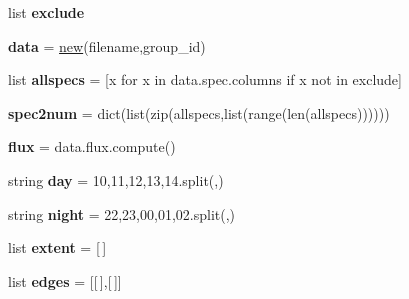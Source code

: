 \begin{DoxyCompactItemize}
\item 
list {\bfseries exclude}
\item 
\mbox{\label{namespacez__multilayer__infomap_a854ef70f57fed9974191d26a9f791af4}} 
{\bfseries data} = \mbox{\hyperlink{classzhdf_1_1new}{new}}(filename,group\+\_\+id)
\item 
\mbox{\label{namespacez__multilayer__infomap_a215e0369fdc8b0f8ca8080c40fe8a2c1}} 
list {\bfseries allspecs} = \mbox{[}x for x in data.\+spec.\+columns if x not in exclude\mbox{]}
\item 
\mbox{\label{namespacez__multilayer__infomap_a44a61e86e0415d87c5a739e50ccc5c9f}} 
{\bfseries spec2num} = dict(list(zip(allspecs,list(range(len(allspecs))))))
\item 
\mbox{\label{namespacez__multilayer__infomap_a6bd22719a7c02fd95aab5ec2ecc03496}} 
{\bfseries flux} = data.\+flux.\+compute()
\item 
\mbox{\label{namespacez__multilayer__infomap_ab64f17b32c3e9b3003413b0f2bbf1388}} 
string {\bfseries day} = \textquotesingle{}10,11,12,13,14\textquotesingle{}.split(\textquotesingle{},\textquotesingle{})
\item 
\mbox{\label{namespacez__multilayer__infomap_ad1c46cf12bd33975ca9f8a42677afeb0}} 
string {\bfseries night} = \textquotesingle{}22,23,00,01,02\textquotesingle{}.split(\textquotesingle{},\textquotesingle{})
\item 
\mbox{\label{namespacez__multilayer__infomap_ae09e5fa6d92a9a2ab31ab8cc8528e7f2}} 
list {\bfseries extent} = \mbox{[}$\,$\mbox{]}
\item 
\mbox{\label{namespacez__multilayer__infomap_a3f22f550af29007b8e833ae0c78dfcfe}} 
list {\bfseries edges} = \mbox{[}\mbox{[}$\,$\mbox{]},\mbox{[}$\,$\mbox{]}\mbox{]}
\item 
\mbox{\label{namespacez__multilayer__infomap_ab6985fc4c5776b03220a35ee38289e36}} 

\end{DoxyCompactItemize}
